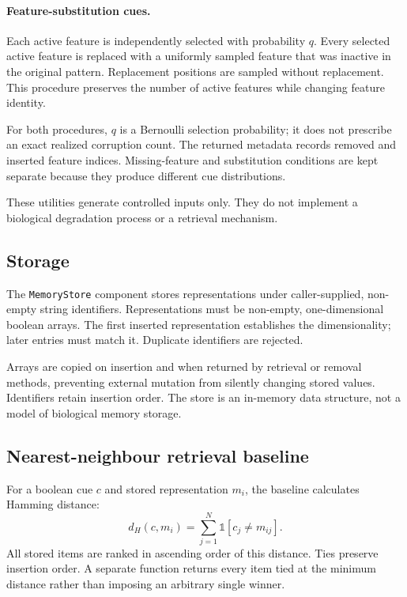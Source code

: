 \documentclass[11pt,a4paper]{article}
\begin{document}
\paragraph{Feature-substitution cues.}
Each active feature is independently selected with probability $q$. Every selected active feature is replaced with a uniformly sampled feature that was inactive in the original pattern. Replacement positions are sampled without replacement. This procedure preserves the number of active features while changing feature identity.

For both procedures, $q$ is a Bernoulli selection probability; it does not prescribe an exact realized corruption count. The returned metadata records removed and inserted feature indices. Missing-feature and substitution conditions are kept separate because they produce different cue distributions.

These utilities generate controlled inputs only. They do not implement a biological degradation process or a retrieval mechanism.

\subsection{Storage}

The \texttt{MemoryStore} component stores representations under caller-supplied, non-empty string identifiers. Representations must be non-empty, one-dimensional boolean arrays. The first inserted representation establishes the dimensionality; later entries must match it. Duplicate identifiers are rejected.

Arrays are copied on insertion and when returned by retrieval or removal methods, preventing external mutation from silently changing stored values. Identifiers retain insertion order. The store is an in-memory data structure, not a model of biological memory storage.

\subsection{Nearest-neighbour retrieval baseline}

For a boolean cue $c$ and stored representation $m_i$, the baseline calculates Hamming distance:
\[
d_H(c,m_i)=\sum_{j=1}^{N}\mathbb{1}[c_j\ne m_{ij}].
\]
All stored items are ranked in ascending order of this distance. Ties preserve insertion order. A separate function returns every item tied at the minimum distance rather than imposing an arbitrary single winner.
\end{document}
